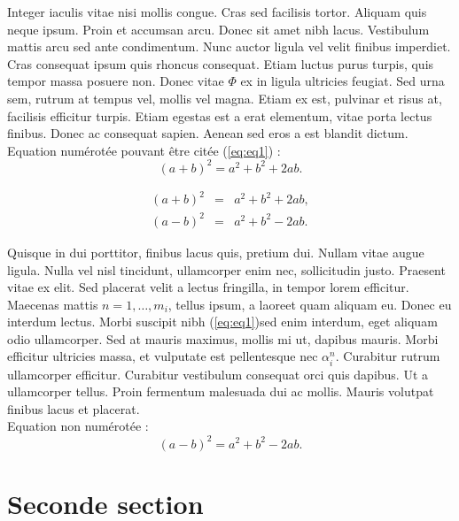 \documentclass[a4paper]{article}
\begin{document}
Integer iaculis vitae nisi mollis congue. Cras sed facilisis tortor. Aliquam quis neque ipsum. Proin et accumsan arcu. Donec sit amet nibh lacus. Vestibulum mattis arcu sed ante  condimentum. Nunc auctor ligula vel velit finibus imperdiet. Cras consequat ipsum quis rhoncus consequat. Etiam luctus purus turpis, quis tempor massa posuere non. Donec vitae $\Phi$ ex in ligula ultricies feugiat. Sed urna sem, rutrum at tempus vel, mollis vel magna. Etiam ex est, pulvinar et risus at, facilisis efficitur turpis. Etiam egestas est a erat elementum, vitae porta lectus finibus. Donec ac consequat sapien. Aenean sed eros a est blandit dictum.\\
{\color{blue}Equation numérotée pouvant être citée (\ref{eq:eq1}) : }
\begin{equation}
\label{eq:eq1}
( a + b )^2 = a^2 + b^2 + 2 a b. 
\end{equation}

\begin{eqnarray}
\label{eq:eq2}
( a + b )^2 &=& a^2 + b^2 + 2 a b,\\
( a - b )^2 &=& a^2 + b^2 - 2 a b.
\end{eqnarray}



Quisque in dui porttitor, finibus lacus quis, pretium dui. Nullam vitae augue ligula. Nulla vel nisl tincidunt, ullamcorper enim nec, sollicitudin justo. Praesent vitae ex elit. Sed placerat velit a lectus fringilla, in tempor lorem efficitur. Maecenas mattis  $n = 1,\dots,m_i$, tellus ipsum, a laoreet quam aliquam eu. Donec eu interdum lectus. Morbi suscipit nibh (\ref{eq:eq1})sed enim interdum, eget aliquam odio ullamcorper. Sed at mauris maximus, mollis mi ut, dapibus mauris. Morbi efficitur ultricies massa, et vulputate est pellentesque nec $\alpha_i^n$. Curabitur rutrum ullamcorper efficitur. Curabitur vestibulum consequat orci quis dapibus. Ut a ullamcorper tellus. Proin fermentum malesuada dui ac mollis. Mauris volutpat finibus lacus et placerat. \\
{\color{blue}Equation non numérotée : }
\begin{equation*}
( a - b )^2 = a^2 + b^2 - 2 a b. 
\end{equation*}

\section{Seconde section}
\end{document}
